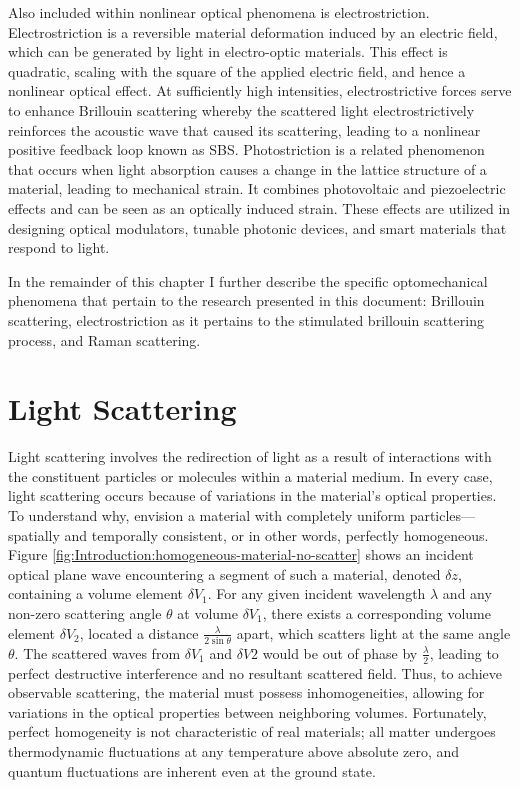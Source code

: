 Also included within nonlinear optical phenomena is electrostriction. Electrostriction is a reversible material deformation induced by an electric field, which can be generated by light in electro-optic materials. This effect is quadratic, scaling with the square of the applied electric field, and hence a nonlinear optical effect. At sufficiently high intensities, electrostrictive forces serve to enhance Brillouin scattering whereby the scattered light electrostrictively reinforces the acoustic wave that caused its scattering, leading to a nonlinear positive feedback loop known as \ac{SBS}. Photostriction is a related phenomenon that occurs when light absorption causes a change in the lattice structure of a material, leading to mechanical strain. It combines photovoltaic and piezoelectric effects and can be seen as an optically induced strain. These effects are utilized in designing optical modulators\cite{}, tunable photonic devices\cite{}, and smart materials that respond to light\cite{}.

In the remainder of this chapter I further describe the specific optomechanical phenomena that pertain to the research presented in this document: Brillouin scattering, electrostriction as it pertains to the stimulated brillouin scattering process, and Raman scattering.


\section{Light Scattering}
\label{sec:Introduction:Light-Scattering}
Light scattering involves the redirection of light as a result of interactions with the constituent particles or molecules within a material medium. In every case, light scattering occurs because of variations in the material's optical properties. To understand why, envision a material with completely uniform particles---spatially and temporally consistent, or in other words, perfectly homogeneous. Figure \ref{fig:Introduction:homogeneous-material-no-scatter} shows an incident optical plane wave encountering a segment of such a material, denoted $\delta z$, containing a volume element $\delta V_{1}$. For any given incident wavelength $\lambda$ and any non-zero scattering angle $\theta$ at volume $\delta V_{1}$, there exists a corresponding volume element $\delta V_{2}$, located a distance $\frac{\lambda}{2\sin\theta}$ apart, which scatters light at the same angle $\theta$. The scattered waves from $\delta V_{1}$ and $\delta V{2}$ would be out of phase by $\frac{\lambda}{2}$, leading to perfect destructive interference and no resultant scattered field. Thus, to achieve observable scattering, the material must possess inhomogeneities, allowing for variations in the optical properties between neighboring volumes. Fortunately, perfect homogeneity is not characteristic of real materials; all matter undergoes thermodynamic fluctuations at any temperature above absolute zero, and quantum fluctuations are inherent even at the ground state.

